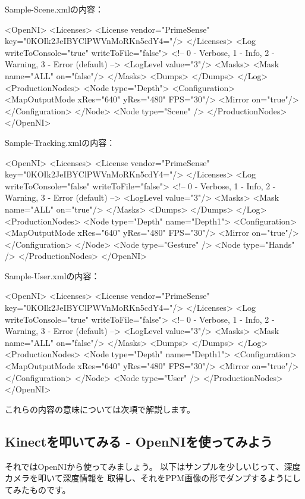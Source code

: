 \documentclass[mingoth,a4paper]{jsarticle}
\begin{document}
Sample-Scene.xmlの内容：
\begin{commandline}
<OpenNI>
  <Licenses>
    <License vendor="PrimeSense" key="0KOIk2JeIBYClPWVnMoRKn5cdY4="/>
  </Licenses>
  <Log writeToConsole="true" writeToFile="false">
    <!-- 0 - Verbose, 1 - Info, 2 - Warning, 3 - Error (default) -->
    <LogLevel value="3"/>
    <Masks>
    <Mask name="ALL" on="false"/>
    </Masks>
    <Dumps>
    </Dumps>
  </Log>
  <ProductionNodes>
    <Node type="Depth">
      <Configuration>
        <MapOutputMode xRes="640" yRes="480" FPS="30"/>
        <Mirror on="true"/>
      </Configuration>
    </Node>
    <Node type="Scene" />
  </ProductionNodes>
</OpenNI>
\end{commandline}

Sample-Tracking.xmlの内容：
\begin{commandline}
<OpenNI>
  <Licenses>
    <License vendor="PrimeSense" key="0KOIk2JeIBYClPWVnMoRKn5cdY4="/>
  </Licenses>
  <Log writeToConsole="false" writeToFile="false">
    <!-- 0 - Verbose, 1 - Info, 2 - Warning, 3 - Error (default) -->
    <LogLevel value="3"/>
    <Masks>
    <Mask name="ALL" on="true"/>
    </Masks>
    <Dumps>
    </Dumps>
  </Log>
  <ProductionNodes>
    <Node type="Depth" name="Depth1">
      <Configuration>
      <MapOutputMode xRes="640" yRes="480" FPS="30"/>
      <Mirror on="true"/>
      </Configuration>
    </Node>
    <Node type="Gesture" />
    <Node type="Hands" />
  </ProductionNodes>
</OpenNI>
\end{commandline}

Sample-User.xmlの内容：
\begin{commandline}
<OpenNI>
  <Licenses>
    <License vendor="PrimeSense" key="0KOIk2JeIBYClPWVnMoRKn5cdY4="/>
  </Licenses>
  <Log writeToConsole="true" writeToFile="false">
    <!-- 0 - Verbose, 1 - Info, 2 - Warning, 3 - Error (default) -->
    <LogLevel value="3"/>
    <Masks>
    <Mask name="ALL" on="false"/>
    </Masks>
    <Dumps>
    </Dumps>
  </Log>
  <ProductionNodes>
    <Node type="Depth" name="Depth1">
      <Configuration>
      <MapOutputMode xRes="640" yRes="480" FPS="30"/>
      <Mirror on="true"/>
      </Configuration>
    </Node>
    <Node type="User" />
  </ProductionNodes>
</OpenNI>
\end{commandline}

これらの内容の意味については次項で解説します。

\subsection{Kinectを叩いてみる - OpenNIを使ってみよう}
それではOpenNIから使ってみましょう。
以下はサンプルを少しいじって、深度カメラを叩いて深度情報を
取得し、それをPPM画像の形でダンプするようにしてみたものです。
\end{document}
